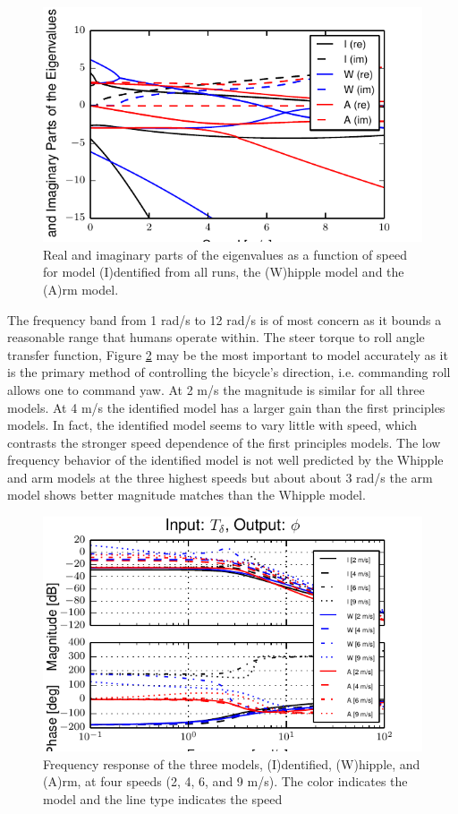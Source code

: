 \documentclass[a4paper]{article}
\begin{document}
\begin{figure}
  \centering
  \includegraphics[width=5in]{figures/L-P-eig.pdf}
  \caption{Real and imaginary parts of the eigenvalues as a function of speed
    for model (I)dentified from all runs, the (W)hipple model and the (A)rm
    model.}
  \label{fig:L-P-eig}
\end{figure}

The frequency band from 1 rad/s to 12 rad/s is of most concern as it bounds a
reasonable range that humans operate within. The steer torque
to roll angle transfer function, Figure \ref{fig:L-P-Tdel-Phi} may be the most
important to model accurately as it is the primary method of controlling the
bicycle's direction, i.e. commanding roll allows one to command yaw. At 2 m/s
the magnitude is similar for all three models. At 4 m/s the identified model
has a larger gain than the first principles models. In fact, the identified
model seems to vary little with speed, which contrasts the stronger speed
dependence of the first principles models. The low frequency behavior of the
identified model is not well predicted by the Whipple and arm models at the
three highest speeds but about about 3 rad/s the arm model shows better
magnitude matches than the Whipple model.

\begin{figure}
  \centering
  \includegraphics[width=5in]{figures/L-P-Tdel-Phi.pdf}
  \caption{Frequency response of the three models, (I)dentified, (W)hipple, and
    (A)rm, at four speeds (2, 4, 6, and 9 m/s). The color indicates the model
    and the line type indicates the speed}
  \label{fig:L-P-Tdel-Phi}
\end{figure}
\end{document}
